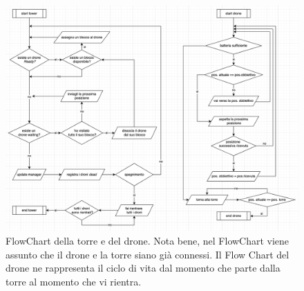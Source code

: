 \documentclass[a4paper, 11pt]{article}
\begin{document}
\begin{figure}[H]
    \centering
    \includegraphics[height = 13 cm]{image/FlowCharts.png}%
    
    \caption{\small{FlowChart della torre e del drone. Nota bene, nel FlowChart viene assunto che il drone e la torre siano già connessi. Il Flow Chart del drone ne rappresenta il ciclo di vita dal momento che parte dalla torre al momento che vi rientra.}}
    
\end{figure}
\end{document}

